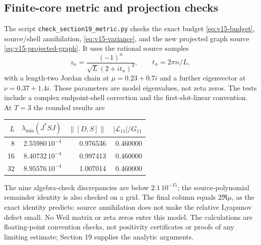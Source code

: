 \documentclass[11pt]{article}
\theoremstyle{remark}
\begin{document}
\subsection*{Finite-core metric and projection checks}
The script \texttt{check\_section19\_metric.py} checks the exact budget
\eqref{eq:v15-budget}, source/shell annihilation,
\eqref{eq:v15-variance}, and the new projected graph source
\eqref{eq:v15-projected-graph}. It uses the rational source samples
\[
 z_n=\frac{(-1)^n}{\sqrt L(2+it_n)^3},\qquad t_n=2\pi n/L,
\]
with a length-two Jordan chain at $\mu=0.23+0.7i$ and a further
eigenvector at $\nu=0.37+1.4i$. These parameters are model eigenvalues,
not zeta zeros. The tests include a complex endpoint-shell correction and
the first-slot-linear convention. At $T=3$ the rounded results are
\begin{center}
\begin{tabular}{rrrr}
\toprule
$L$ & $\lambda_{\min}(J^*SJ)$ & $\|[D,S]\|$
 & $|\mathcal L_{11}|/G_{11}$\\
\midrule
8 & $2.55980\,10^{-4}$ & 0.976536 & 0.460000\\
16 & $8.40732\,10^{-4}$ & 0.997413 & 0.460000\\
32 & $8.95576\,10^{-4}$ & 1.007014 & 0.460000\\
\bottomrule
\end{tabular}
\end{center}
The nine algebra-check discrepancies are below $2.1\,10^{-15}$;
the source-polynomial remainder identity is also checked on a grid.
The final column equals $2\Re\mu$, as the exact identity predicts:
source annihilation does not make the relative Lyapunov defect small.
No Weil matrix or zeta zeros enter this model. The calculations are
floating-point convention checks, not positivity certificates or proofs
of any limiting estimate; Section 19 supplies the analytic arguments.
\end{document}
